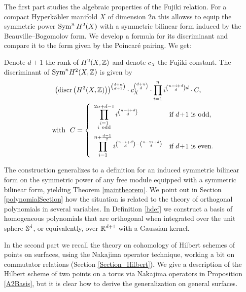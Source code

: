The first part \cite{Kapfer} studies the algebraic properties of the Fujiki relation. For a compact Hyperk\"ahler manifold $X$ of dimension $2n$ this allowss to equip the symmetric power $\Sym^nH^2(X)$ with a symmetric bilinear form induced by the Beauville--Bogomolov form. We develop a formula for its discriminant and compare it to the form given by the Poincar\'e pairing.
We get:
\begin{theorem}
Denote $d+1$ the rank of $H^2(X,\Z)$ and denote $c_X$ the Fujiki constant.
The discriminant of $\Sym^n\!H^2(X,\Z)$ is given by
\begin{gather*}
\left(\discr \left(H^2(X,\Z)\right)\right)^{\binom{d+n}{d+1}}\cdot c_X^{\binom{d+n}{d}} \cdot \prod_{i=1}^n i^{\binom{n-i+d}{d}d} 
\cdot C, \\
\qquad \text{with } \ 
C=
\left\{
 \begin{array}{*2{l}p{5cm}}
 \displaystyle\prod_{\substack{i=1 \\ i\ \text{odd}\\\ }}^{2n+d-1}i^{\binom{n-i+d}{d}} &\text{if }d\!+\! 1\text{ is odd}, \\
 \displaystyle\prod_{i=1}^{n+\frac{d-1}{2}} i^{\binom{n-i+d}{d} - \binom{n-2i+d}{d}} &\text{if }d\! +\! 1\text{ is even}.
\end{array}
\right.
\end{gather*}
\end{theorem}
The construction generalizes to a definition for an induced symmetric bilinear form on the symmetric power of any free module equipped with a symmetric bilinear form, yielding Theorem \ref{maintheorem}. We point out in Section \ref{polynomialSection} how the situation is related to the theory of orthogonal polynomials in several variables.
In Definition \ref{hdef} we construct a basis of homogeneous polynomials that are orthogonal when integrated over the unit sphere $\S^d$, or equivalently, over $\R^{d+1}$ with a Gaussian kernel.

In the second part we recall the theory on cohomology of Hilbert schemes of points on surfaces, using the Nakajima operator technique, working a bit on commutator relations (Section \ref{Section_Hilbert}).
We give a description of the Hilbert scheme of two points on a torus via Nakajima operators in Proposition \ref{A2Basis}, but it is clear how to derive the generalization on general surfaces.

